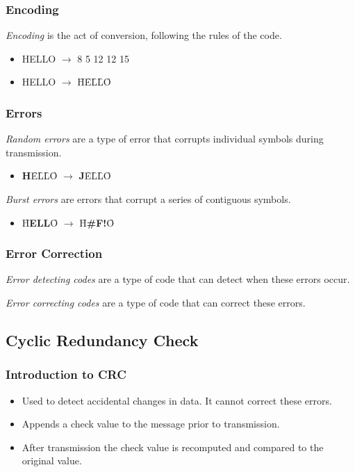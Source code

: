 \documentclass{beamer}
\begin{document}
\begin{frame}
	\frametitle{Encoding}
	\textit{Encoding} is the act of conversion, following the rules of the code.
	
	\begin{itemize}
		\item HELLO $\rightarrow$ 8 5 12 12 15
        \item HELLO $\rightarrow$ \f{H}\f{E}\f{L}\f{L}\f{O}
	\end{itemize}
\end{frame}

\begin{frame}
	\frametitle{Errors}
	\textit{Random errors} are a type of error that corrupts individual symbols during transmission.
	\begin{itemize}
		\item \f{\textbf{H}}\f{E}\f{L}\f{L}\f{O} $\rightarrow$ \f{\textbf{J}}\f{E}\f{L}\f{L}\f{O}
	\end{itemize}
	
	\textit{Burst errors} are errors that corrupt a series of contiguous symbols.
	\begin{itemize}
		\item \f{H}\f{\textbf{E}}\f{\textbf{L}}\f{\textbf{L}}\f{O} $\rightarrow$ \f{H}\f{\textbf{\#}}\f{\textbf{F}}\f{\textbf{!}}\f{O}
	\end{itemize}
\end{frame}

\begin{frame}
	\frametitle{Error Correction}
	\textit{Error detecting codes} are a type of code that can detect when these errors occur.
	
	\textit{Error correcting codes} are a type of code that can correct these errors.
\end{frame}

\subsection{Cyclic Redundancy Check}

\begin{frame}
	\frametitle{Introduction to CRC}
	\begin{itemize}
		\item Used to detect accidental changes in data. It cannot correct these errors.
		\item Appends a check value to the message prior to transmission.
		\item After transmission the check value is recomputed and compared to the original value.
	\end{itemize}
\end{frame}
\end{document}
